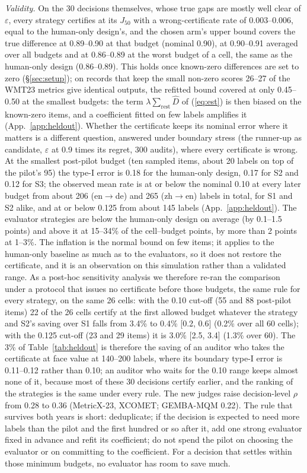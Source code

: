 \documentclass[11pt]{article}
\newcommand{\eps}{\varepsilon}
\newcommand{\Jt}{J_{50}}
\begin{document}
\emph{Validity.} On the 30 decisions themselves, whose true gaps are mostly well clear of $\eps$, every strategy
certifies at its $\Jt$ with a wrong-certificate rate of 0.003--0.006, equal to the human-only design's, and the chosen
arm's upper bound covers the true difference at 0.89--0.90 at that budget (nominal 0.90), at 0.90--0.91 averaged over
all budgets and at 0.86--0.89 at the worst budget of a cell, the same as the human-only design (0.86--0.89). This holds once known-zero differences are set to zero (\S\ref{sec:setup}); on records
that keep the small non-zero scores 26--27 of the WMT23 metrics give identical outputs, the refitted bound covered at
only 0.45--0.50 at the smallest budgets: the term $\lambda\sum_{\text{rest}}\hat D$ of (\ref{eq:est}) is then biased
on the known-zero items, and a coefficient fitted on few labels amplifies it (App.~\ref{app:heldout}).
Whether the certificate keeps its nominal error where it matters is a different question, answered under boundary
stress (the runner-up as candidate, $\eps$ at 0.9 times its regret, 300 audits), where every certificate is wrong. At
the smallest post-pilot budget (ten sampled items, about 20 labels on top of the pilot's 95) the type-I error is 0.18
for the human-only design, 0.17 for S2 and 0.12 for S3; the observed mean rate is at or below the nominal 0.10 at every
later budget from about 206 (en$\to$de) and 265 (zh$\to$en) labels in total, for S1 and S2 alike, and at or below
0.125 from about 145 labels (App.~\ref{app:heldout}). The evaluator strategies are below the human-only design on
average (by 0.1--1.5 points) and above it at 15--34\% of the cell--budget points, by more than 2 points at 1--3\%. The
inflation is the normal bound on few items; it applies to the human-only baseline as much as to the evaluators, so it
does not restore the certificate, and it is an observation on this simulation rather than a validated range. As a
post-hoc sensitivity analysis we therefore re-ran the comparison under a protocol that issues no certificate before
those budgets, the same rule for every strategy, on the same 26 cells: with the 0.10 cut-off (55 and 88 post-pilot
items) 22 of the 26 cells certify at the first allowed budget whatever the strategy and S2's saving over S1 falls from
3.4\% to 0.4\% [0.2, 0.6] (0.2\% over all 60 cells); with the 0.125 cut-off (23 and 29 items) it is 3.0\% [2.5, 3.4]
(1.3\% over 60). The 3\% of Table~\ref{tab:heldout} is therefore the saving of an auditor who takes the certificate at
face value at 140--200 labels, where its boundary type-I error is 0.11--0.12 rather than 0.10; an auditor who waits for
the 0.10 range keeps almost none of it, because most of these 30 decisions certify earlier, and the ranking of the
strategies is the same under every rule. The new judges raise decision-level $\rho$ from 0.28 to 0.36
(MetricX-23, XCOMET; GEMBA-MQM 0.22). The rule that survives both years is short: deduplicate; if the decision is
expected to need more labels than the pilot and the first hundred or so after it, add one strong evaluator fixed in
advance and refit its coefficient; do not spend the pilot on choosing the evaluator or on committing to the
coefficient. For a decision that settles within those minimum budgets, no evaluator has room to save much.
\end{document}
